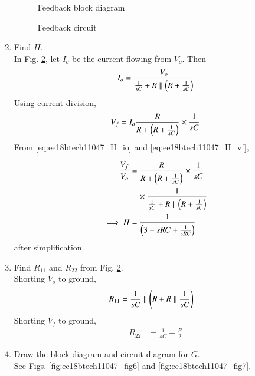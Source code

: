 \begin{enumerate}[label=\arabic*.,ref=\theenumi]
\renewcommand{\thefigure}{\theenumi.\arabic{figure}}
\begin{figure}[!ht]
	\begin{center}
		\resizebox{\columnwidth}{!}{}
	\end{center}
\caption{Feedback block diagram}
\label{fig:ee18btech11047_fig4}
\end{figure}
\begin{figure}[!ht]
	\begin{center}
		\resizebox{\columnwidth}{!}{}
	\end{center}
\caption{Feedback circuit}
\label{fig:ee18btech11047_fig5}
\end{figure}
\renewcommand{\thefigure}{\theenumi}
\item Find $H$.
\\
\solution In Fig. \ref{fig:ee18btech11047_fig5}, let $I_o$ be the current flowing from $V_o$.  Then
\begin{align}
\label{eq:ee18btech11047_H_io}
I_o = \frac{V_o}{\frac{1}{sC} + R \parallel \brak{R+\frac{1}{sC}}}
\end{align}
%
Using current division,
\begin{align}
\label{eq:ee18btech11047_H_vf}
V_f = I_o \frac{R}{R +  \brak{R+\frac{1}{sC}}} \times \frac{1}{sC}
\end{align}
From \eqref{eq:ee18btech11047_H_io} and \eqref{eq:ee18btech11047_H_vf},


\begin{align}
\frac{V_{f}}{V_{o}} &= \frac{R}{R +  \brak{R+\frac{1}{sC}}} \times \frac{1}{sC} 
\nonumber \\
&\quad \times \frac{1}{\frac{1}{sC} + R \parallel \brak{R+\frac{1}{sC}}}
\\
\implies H &= \frac{1}{\brak{3+sRC +\frac{1}{sRC}}}
\label{eq:ee18btech11047_H}
\end{align}
%
after simplification.
\item Find $R_{11}$ and $R_{22}$ from Fig. \ref{fig:ee18btech11047_fig5}. 
\\
\solution Shorting  $V_{o}$ to ground,
\begin{align}
R_{11} &= \frac{1}{sC} \parallel \brak{R+ R\parallel\frac{1}{sC}} 
\label{eq:ee18btech11047_6}
\end{align}
Shorting $V_{f}$ to ground,
\begin{align}
R_{22} &= \frac{1}{sC} + \frac{R}{2}   
\end{align}
%
\item Draw the block diagram and circuit diagram for $G$.\\
\solution See Figs. \ref{fig:ee18btech11047_fig6} and \ref{fig:ee18btech11047_fig7}.


\end{enumerate}

